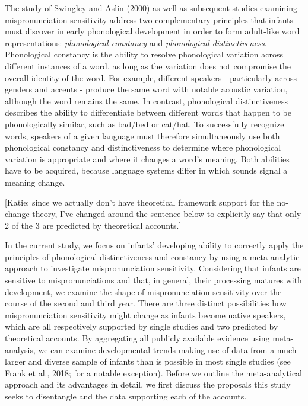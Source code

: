 \documentclass[man]{apa6}
\theoremstyle{definition}
\theoremstyle{definition}
\theoremstyle{definition}
\theoremstyle{remark}
\begin{document}
The study of Swingley and Aslin (2000) as well as subsequent studies
examining mispronunciation sensitivity address two complementary
principles that infants must discover in early phonological development
in order to form adult-like word representations: \emph{phonological
constancy} and \emph{phonological distinctiveness}. Phonological
constancy is the ability to resolve phonological variation across
different instances of a word, as long as the variation does not
compromise the overall identity of the word. For example, different
speakers - particularly across genders and accents - produce the same
word with notable acoustic variation, although the word remains the
same. In contrast, phonological distinctiveness describes the ability to
differentiate between different words that happen to be phonologically
similar, such as bad/bed or cat/hat. To successfully recognize words,
speakers of a given language must therefore simultaneously use both
phonological constancy and distinctiveness to determine where
phonological variation is appropriate and where it changes a word's
meaning. Both abilities have to be acquired, because language systems
differ in which sounds signal a meaning change.

{[}Katie: since we actually don't have theoretical framework support for
the no-change theory, I've changed around the sentence below to
explicitly say that only 2 of the 3 are predicted by theoretical
accounts.{]}

In the current study, we focus on infants' developing ability to
correctly apply the principles of phonological distinctiveness and
constancy by using a meta-analytic approach to investigate
mispronunciation sensitivity. Considering that infants are sensitive to
mispronunciations and that, in general, their processing matures with
development, we examine the shape of mispronunciation sensitivity over
the course of the second and third year. There are three distinct
possibilities how mispronunciation sensitivity might change as infants
become native speakers, which are all respectively supported by single
studies and two predicted by theoretical accounts. By aggregating all
publicly available evidence using meta-analysis, we can examine
developmental trends making use of data from a much larger and diverse
sample of infants than is possible in most single studies (see Frank et
al., 2018; for a notable exception). Before we outline the
meta-analytical approach and its advantages in detail, we first discuss
the proposals this study seeks to disentangle and the data supporting
each of the accounts.
\end{document}
